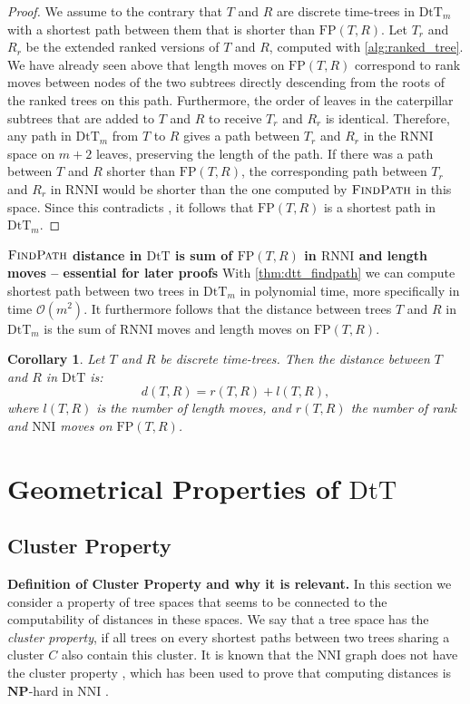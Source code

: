 \documentclass[11pt]{amsart}
\newtheorem{corollary}{Corollary}
\newcommand{\rnni}{\mathrm{RNNI}}
\newcommand{\findpath}{\textsc{FindPath}}
\newcommand{\nni}{\mathrm{NNI}}
\newcommand{\fp}{\mathrm{FP}}
\newcommand{\dtt}{\mathrm{DtT}}
\newcommand{\np}{\mathbf{NP}}
\renewcommand{\O}{\mathcal O}
\newcommand{\summary}[1]{\textbf{#1}} %
\begin{document}
\begin{proof}
	We assume to the contrary that $T$ and $R$ are discrete time-trees in $\dtt_m$ with a shortest path between them that is shorter than $\fp(T,R)$.
	Let $T_r$ and $R_r$ be the extended ranked versions of $T$ and $R$, computed with \autoref{alg:ranked_tree}.
	We have already seen above that length moves on $\fp(T,R)$ correspond to rank moves between nodes of the two subtrees directly descending from the roots of the ranked trees on this path.
	Furthermore, the order of leaves in the caterpillar subtrees that are added to $T$ and $R$ to receive $T_r$ and $R_r$ is identical.
	Therefore, any path in $\dtt_m$ from $T$ to $R$ gives a path between $T_r$ and $R_r$ in the $\rnni$ space on $m+2$ leaves, preserving the length of the path.
	If there was a path between $T$ and $R$ shorter than $\fp(T,R)$, the corresponding path between $T_r$ and $R_r$ in $\rnni$ would be shorter than the one computed by $\findpath$ in this space.
	Since this contradicts \autocite[Theorem 1]{Collienne2020-iu}, it follows that $\fp(T,R)$ is a shortest path in $\dtt_m$.
\end{proof}

\summary{$\findpath$ distance in $\dtt$ is sum of $\fp(T,R)$ in $\rnni$ and length moves -- essential for later proofs}
With \autoref{thm:dtt_findpath} we can compute shortest path between two trees in $\dtt_m$ in polynomial time, more specifically in time $\O(m^2)$.
It furthermore follows that the distance between trees $T$ and $R$ in $\dtt_m$ is the sum of $\rnni$ moves and length moves on $\fp(T,R)$.

\begin{corollary}
	Let $T$ and $R$ be discrete time-trees.
	Then the distance between $T$ and $R$ in $\dtt$ is:
	\[d(T,R) = r(T,R) + l(T,R),\]
	where $l(T,R)$ is the number of length moves, and $r(T,R)$ the number of rank and $\nni$ moves on $\fp(T,R)$.
\end{corollary}


\section{Geometrical Properties of $\dtt$}

\subsection{Cluster Property}

\summary{Definition of Cluster Property and why it is relevant.}
In this section we consider a property of tree spaces that seems to be connected to the computability of distances in these spaces.
We say that a tree space has the \emph{cluster property}, if all trees on every shortest paths between two trees sharing a cluster $C$ also contain this cluster.
It is known that the $\nni$ graph does not have the cluster property \autocite{Li1996-zw}, which has been used to prove that computing distances is $\np$-hard in $\nni$ \autocite{Dasgupta2000-xa}.
\end{document}
